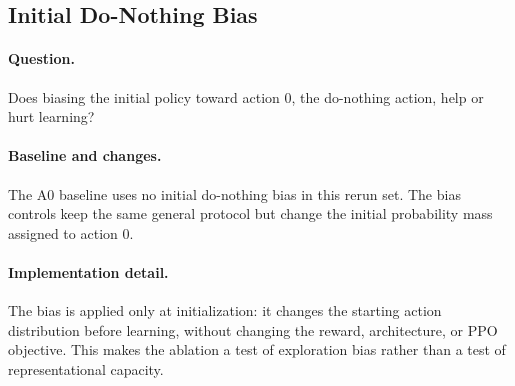 \begin{table}[H]
  \centering
  \small
  \caption{A0 core rerun survival summary.}
  \label{tab:a0-core-summary}
\end{table}

\subsection{Initial Do-Nothing Bias}
\label{subsec:a0-bias-reruns}

\paragraph{Question.}
Does biasing the initial policy toward action 0, the do-nothing action, help or
hurt learning?

\paragraph{Baseline and changes.}
The A0 baseline uses no initial do-nothing bias in this rerun set. The bias
controls keep the same general protocol but change the initial probability mass
assigned to action 0.


\paragraph{Implementation detail.}
The bias is applied only at initialization: it changes the starting action
distribution before learning, without changing the reward, architecture, or PPO
objective. This makes the ablation a test of exploration bias rather than a test
of representational capacity.

